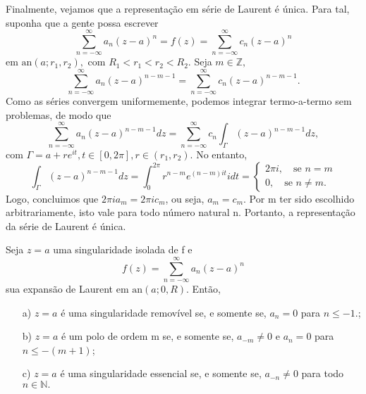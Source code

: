 \documentclass[ComplexAnalysis/complex.tex]{subfiles}
\begin{document}
\begin{proof*}
	Finalmente, vejamos que a representação em série de Laurent é única. Para tal, suponha que a gente possa escrever
	\[
		\sum\limits_{n=-\infty}^{\infty}a_{n}(z-a)^{n} = f(z) = \sum\limits_{n=-\infty}^{\infty}c_{n}(z-a)^{n}
	\]
	em \(\mathrm{an}(a; r_{1}, r_{2}),\) com \(R_{1} < r_{1} < r_{2} < R_{2}.\) Seja \(m\in \mathbb{Z},\)
	\[
		\sum\limits_{n=-\infty}^{\infty}a_{n}(z-a)^{n-m-1} = \sum\limits_{n=-\infty}^{\infty}c_{n}(z-a)^{n-m-1}.
	\]
	Como as séries convergem uniformemente, podemos integrar termo-a-termo sem problemas, de modo que
	\[
		\sum\limits_{n=-\infty}^{\infty}a_{n}(z-a)^{n-m-1}dz = \sum\limits_{n=-\infty}^{\infty}c_{n}\int_{\Gamma }^{}(z-a)^{n-m-1}dz,
	\]
	com \(\Gamma = a + r e^{it}, t\in [0, 2\pi ], r\in (r_{1}, r_{2}).\) No entanto,
	\[
		\int_{\Gamma }^{}(z-a)^{n-m-1}dz = \int_{0}^{2\pi }r^{n-m}e^{(n-m)it}idt  = \left\{\begin{array}{ll}
			2\pi i,\quad \text{se } n =m \\
			0,\quad \text{se } n\neq m.
		\end{array}\right.
	\]
	Logo, concluimos que \(2\pi i a_{m} = 2\pi i c_{m}\), ou seja, \(a_{m}=c_{m}.\) Por m ter sido escolhido arbitrariamente,
	isto vale para todo número natural n. Portanto, a representação da série de Laurent é única. \qedsymbol
\end{proof*}
\begin{crl*}
	Seja \(z=a\) uma singularidade isolada de f e
	\[
		f(z) = \sum\limits_{n=-\infty}^{\infty}a_{n}(z-a)^{n}
	\]
	sua expansão de Laurent em \(\mathrm{an}(a; 0, R).\) Então,
	\begin{itemize}
		\item[a)] \(z=a\) é uma singularidade removível se, e somente se, \(a_{n} = 0\) para \(n\leq -1.\);
		\item[b)] \(z=a\) é um polo de ordem m se, e somente se, \(a_{-m}\neq0\) e \(a_{n}=0\) para \(n\leq -(m+1)\);
		\item[c)] \(z=a\) é uma singularidade essencial se, e somente se, \(a_{-n}\neq0\) para todo \(n\in \mathbb{N}.\)
	\end{itemize}
\end{crl*}
\end{document}
